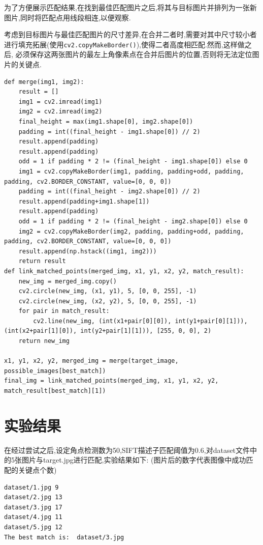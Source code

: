 \documentclass[a4paper]{article}
\begin{document}
为了方便展示匹配结果,在找到最佳匹配图片之后,将其与目标图片并排列为一张新图片,同时将匹配点用线段相连,以便观察.

考虑到目标图片与最佳匹配图片的尺寸差异,在合并二者时,需要对其中尺寸较小者进行填充拓展(使用\texttt
{cv2.copyMakeBorder()}),使得二者高度相匹配.然而,这样做之后,
必须保存这两张图片的最左上角像素点在合并后图片的位置,否则将无法定位图片的关键点.

\begin{verbatim}
def merge(img1, img2):
    result = []
    img1 = cv2.imread(img1)
    img2 = cv2.imread(img2)
    final_height = max(img1.shape[0], img2.shape[0])
    padding = int((final_height - img1.shape[0]) // 2)
    result.append(padding)
    result.append(padding)
    odd = 1 if padding * 2 != (final_height - img1.shape[0]) else 0
    img1 = cv2.copyMakeBorder(img1, padding, padding+odd, padding, padding, cv2.BORDER_CONSTANT, value=[0, 0, 0])
    padding = int((final_height - img2.shape[0]) // 2)
    result.append(padding+img1.shape[1])
    result.append(padding)
    odd = 1 if padding * 2 != (final_height - img2.shape[0]) else 0
    img2 = cv2.copyMakeBorder(img2, padding, padding+odd, padding, padding, cv2.BORDER_CONSTANT, value=[0, 0, 0])
    result.append(np.hstack((img1, img2)))
    return result
def link_matched_points(merged_img, x1, y1, x2, y2, match_result):
    new_img = merged_img.copy()
    cv2.circle(new_img, (x1, y1), 5, [0, 0, 255], -1)
    cv2.circle(new_img, (x2, y2), 5, [0, 0, 255], -1)
    for pair in match_result:
        cv2.line(new_img, (int(x1+pair[0][0]), int(y1+pair[0][1])), (int(x2+pair[1][0]), int(y2+pair[1][1])), [255, 0, 0], 2)
    return new_img

x1, y1, x2, y2, merged_img = merge(target_image, possible_images[best_match])
final_img = link_matched_points(merged_img, x1, y1, x2, y2, match_result[best_match][1])
\end{verbatim}
    \newpage
    \section{实验结果}
在经过尝试之后,设定角点检测数为50,SIFT描述子匹配阈值为0.6,对dataset文件中的5张图片与target.jpg进行匹配,实验结果如下:
(图片后的数字代表图像中成功匹配的关键点个数)
\begin{verbatim}
dataset/1.jpg 9
dataset/2.jpg 13
dataset/3.jpg 17
dataset/4.jpg 11
dataset/5.jpg 12
The best match is:  dataset/3.jpg
\end{verbatim}
\end{document}
